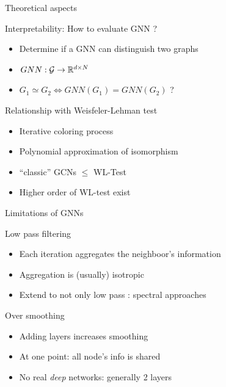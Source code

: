 \documentclass[11pt]{beamer}
\begin{document}
\begin{frame}[allowframebreaks]{Theoretical aspects}
  \begin{block}{Interpretability: How to evaluate GNN ? }
    \begin{itemize}
    \item Determine if a GNN can distinguish two graphs
    \item $GNN : \mathcal{G} \to {\mathbb{R}}^{d \times N}$
    \item $G_1 \simeq G_2 \Leftrightarrow GNN(G_1) = GNN(G_2)$ ?
    \end{itemize}
  \end{block}
  \break

{\small   \begin{block}{Relationship with Weisfeler-Lehman test}
    \begin{itemize}
    \item Iterative coloring process
    \item Polynomial approximation of isomorphism
    \item ``classic'' GCNs $\leq$ WL-Test
    \item Higher order of WL-test exist
    \end{itemize}
  \end{block}
}  
  
\end{frame}



\begin{frame}{Limitations of GNNs}
  \begin{block}{Low pass filtering}
    \begin{itemize}
    \item Each iteration aggregates the neighboor's information
    \item Aggregation is (usually) isotropic
    \item Extend to not only low pass : spectral approaches\\
    \end{itemize}
  \end{block}
  \begin{block}{Over smoothing}
    \begin{itemize}
    \item Adding layers increases smoothing
    \item At one point: all node's info is shared 
    \item No real \emph{deep} networks: generally 2 layers
    \end{itemize}
  \end{block}
\end{frame}
\end{document}
